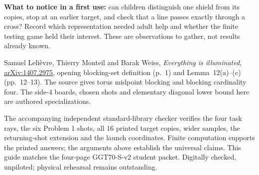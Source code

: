 \documentclass[11pt,letterpaper]{article}
\newcommand{\sectiontitle}[1]{\par\vspace{4pt}{\large\bfseries #1}\par}
\begin{document}
\textbf{What to notice in a first use:} can children distinguish one shield from its copies, stop at an earlier target, and check that a line passes exactly through a cross? Record which representation needed adult help and whether the finite testing game held their interest. These are observations to gather, not results already known.

\sectiontitle{Source and verification}
Samuel Leli\`evre, Thierry Monteil and Barak Weiss, \emph{Everything is illuminated}, \href{https://arxiv.org/pdf/1407.2975}{arXiv:1407.2975}, opening blocking-set definition (p.~1) and Lemma~12(a)--(c) (pp.~12--13). The source gives torus midpoint blocking and blocking cardinality four. The side-$4$ boards, chosen shots and elementary diagonal lower bound here are authored specializations.

The accompanying independent standard-library checker verifies the four task rays, the six Problem 1 shots, all 16 printed target copies, wider samples, the returning-shot extension and the launch coordinates. Finite computation supports the printed answers; the arguments above establish the universal claims. This guide matches the four-page GGT70-S-v2 student packet. Digitally checked, unpiloted; physical rehearsal remains outstanding.
\end{document}
